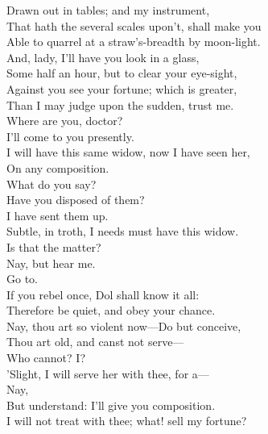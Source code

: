 \documentclass[a4paper,oneside]{memoir}
\begin{document}
\begin{drama*}
Drawn out in tables; and my instrument,\\
That hath the several scales upon't, shall make you\\
Able to quarrel at a straw's-breadth by moon-light.\\
And, lady, I'll have you look in a glass,\\
Some half an hour, but to clear your eye-sight,\\
Against you see your fortune; which is greater,\\
Than I may judge upon the sudden, trust me.\\
\facespeaks Where are you, doctor?\\
\subtlespeaks {} I'll come to you presently.\\
\facespeaks {} I will have this same widow, now I have seen her,\\
On any composition.\\
\subtlespeaks {} What do you say?\\
\facespeaks Have you disposed of them?\\
\subtlespeaks {} I have sent them up.\\
\facespeaks Subtle, in troth, I needs must have this widow.\\
\subtlespeaks Is that the matter?\\
\facespeaks {} Nay, but hear me.\\
\subtlespeaks {} Go to.\\
If you rebel once, Dol shall know it all:\\
Therefore be quiet, and obey your chance.\\
\facespeaks Nay, thou art so violent now---Do but conceive,\\
Thou art old, and canst not serve---\\
\subtlespeaks {} Who cannot? I?\\
'Slight, I will serve her with thee, for a---\\
\facespeaks {} Nay,\\
But understand: I'll give you composition.\\
\subtlespeaks I will not treat with thee; what! sell my fortune?\\

\end{drama*}
\end{document}
